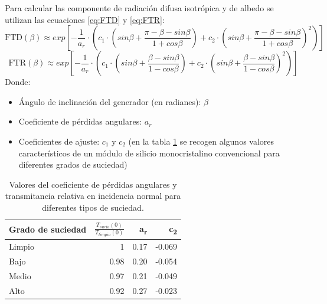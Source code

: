 Para calcular las componente de radiación difusa isotrópica y de albedo se utilizan las ecuaciones \ref{eq:FTD} y \ref{eq:FTR}:
\begin{equation}
\text{FTD}(\beta) \approx exp[-\frac{1}{a_r}\cdot (c_1\cdot (sin\beta +\frac{\pi -\beta - sin\beta}{1+cos\beta})+c_2\cdot (sin\beta +\frac{\pi -\beta -sin\beta}{1+cos\beta})^2)]
\label{eq:FTD}
\end{equation}
\begin{equation}
\text{FTR}(\beta) \approx exp[-\frac{1}{a_r}\cdot (c_1\cdot (sin\beta +\frac{\beta - sin\beta}{1-cos\beta})+c_2\cdot (sin\beta +\frac{\beta -sin\beta}{1-cos\beta})^2)]
\end{equation}
\label{eq:FTR}
Donde:
\begin{itemize}
\item Ángulo de inclinación del generador (en radianes): \(\beta\) 
\item Coeficiente de pérdidas angulares: \(a_r\)
\item Coeficientes de ajuste: \(c_1\) y \(c_2\) (en la tabla \ref{tab:coef-perd} se recogen algunos valores característicos de un módulo de silicio monocristalino convencional para diferentes grados de suciedad)
\end{itemize}
\begin{table}[htbp]
\caption{Valores del coeficiente de pérdidas angulares y transmitancia relativa en incidencia normal para diferentes tipos de suciedad. \label{tab:coef-perd}}
\centering
\begin{tabular}{lrrr}
\hline
Grado de suciedad & \(\frac{T_{sucio}(0)}{T_{limpio}(0)}\) & a\textsubscript{r} & c\textsubscript{2}\\[0pt]
\hline
Limpio & 1 & 0.17 & -0.069\\[0pt]
\hline
Bajo & 0.98 & 0.20 & -0.054\\[0pt]
\hline
Medio & 0.97 & 0.21 & -0.049\\[0pt]
\hline
Alto & 0.92 & 0.27 & -0.023\\[0pt]
\hline
\end{tabular}
\end{table}

